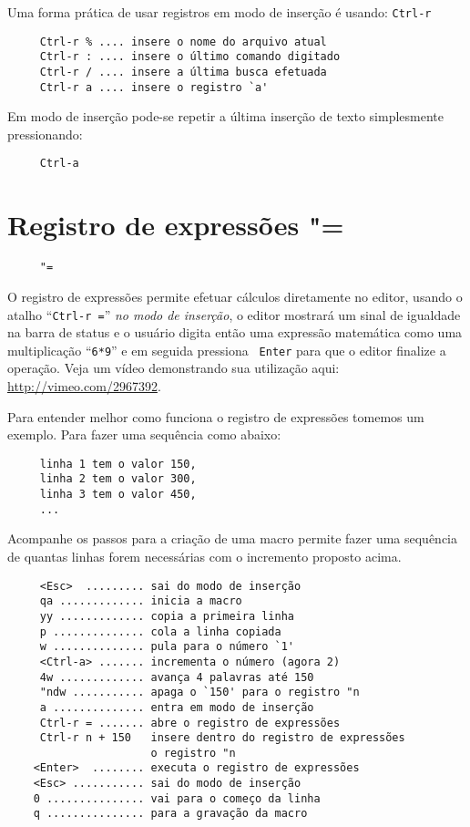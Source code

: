 Uma forma prática de usar registros em modo de inserção é usando:
\verb|Ctrl-r|


\begin{verbatim}
     Ctrl-r % .... insere o nome do arquivo atual
     Ctrl-r : .... insere o último comando digitado
     Ctrl-r / .... insere a última busca efetuada
     Ctrl-r a .... insere o registro `a'
\end{verbatim}

Em modo de inserção pode-se repetir a última inserção de texto
simplesmente pressionando:

\begin{verbatim}
     Ctrl-a
\end{verbatim}

\section{Registro de expressões "=}
\label{sec:Registro de expressões "=}

\begin{verbatim}
     "=
\end{verbatim}

O registro de expressões permite efetuar cálculos diretamente no editor, usando
o atalho ``{\tt Ctrl-r =}'' {\em no modo de inserção}, o editor mostrará um
sinal de igualdade na barra de status e o usuário digita então uma expressão
matemática como uma multiplicação ``{\tt 6*9}'' e em seguida pressiona {\tt
Enter} para que o editor finalize a operação.  Veja um vídeo demonstrando sua
utilização aqui: \url{http://vimeo.com/2967392}.


Para entender melhor como funciona o registro de expressões tomemos um exemplo.
Para fazer uma sequência como abaixo:

\begin{verbatim}
     linha 1 tem o valor 150,
     linha 2 tem o valor 300,
     linha 3 tem o valor 450,
     ...
\end{verbatim}

Acompanhe os passos para a criação de uma macro permite fazer uma
sequência de quantas linhas forem necessárias com o incremento proposto acima.

\begin{verbatim}
     <Esc>  ......... sai do modo de inserção
     qa ............. inicia a macro
     yy ............. copia a primeira linha
     p .............. cola a linha copiada
     w .............. pula para o número `1'
     <Ctrl-a> ....... incrementa o número (agora 2)
     4w ............. avança 4 palavras até 150
     "ndw ........... apaga o `150' para o registro "n
     a .............. entra em modo de inserção
     Ctrl-r = ....... abre o registro de expressões
     Ctrl-r n + 150   insere dentro do registro de expressões
                      o registro "n
    <Enter>  ........ executa o registro de expressões
    <Esc> ........... sai do modo de inserção
    0 ............... vai para o começo da linha
    q ............... para a gravação da macro
\end{verbatim}

